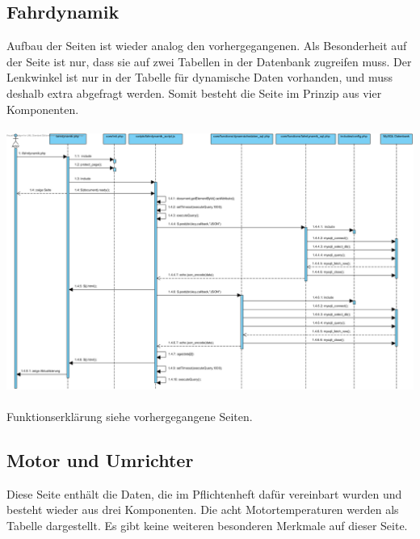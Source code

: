\documentclass[fontsize = 12pt, paper = a4]{scrreprt}
\begin{document}
\newpage


\subsection{Fahrdynamik}
Aufbau der Seiten ist wieder analog den vorhergegangenen. Als Besonderheit auf der Seite ist nur, dass sie auf zwei Tabellen in der Datenbank zugreifen muss. Der Lenkwinkel ist nur in der Tabelle für dynamische Daten vorhanden, und muss deshalb extra abgefragt werden. Somit besteht die Seite im Prinzip aus vier Komponenten.\\ \\


\includegraphics[scale=0.42]{fahrdynamik.png}
\\ \\
Funktionserklärung siehe vorhergegangene Seiten.\\


\newpage

\subsection{Motor und Umrichter}

Diese Seite enthält die Daten, die im Pflichtenheft dafür vereinbart wurden und besteht wieder aus drei Komponenten. Die acht Motortemperaturen werden als Tabelle dargestellt. Es gibt keine weiteren besonderen Merkmale auf dieser Seite.\\ \\
\end{document}
